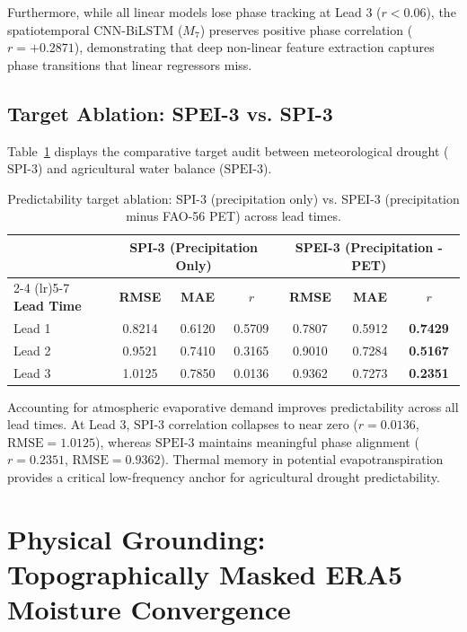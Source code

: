 \documentclass{article}
\begin{document}
Furthermore, while all linear models lose phase tracking at Lead 3 ($r < 0.06$), the spatiotemporal CNN-BiLSTM ($M_7$) preserves positive phase correlation ($r = +0.2871$), demonstrating that deep non-linear feature extraction captures phase transitions that linear regressors miss.

\subsection{Target Ablation: SPEI-3 vs. SPI-3}
Table~\ref{tab:target_ablation} displays the comparative target audit between meteorological drought ($\text{SPI-3}$) and agricultural water balance ($\text{SPEI-3}$).

\begin{table}[H]
\centering
\caption{Predictability target ablation: SPI-3 (precipitation only) vs. SPEI-3 (precipitation minus FAO-56 PET) across lead times.}
\label{tab:target_ablation}
\begin{tabular}{l ccc ccc}
\toprule
& \multicolumn{3}{c}{\textbf{SPI-3 (Precipitation Only)}} & \multicolumn{3}{c}{\textbf{SPEI-3 (Precipitation - PET)}} \\
\cmidrule(lr){2-4} \cmidrule(lr){5-7}
\textbf{Lead Time} & \textbf{RMSE} & \textbf{MAE} & \textbf{$r$} & \textbf{RMSE} & \textbf{MAE} & \textbf{$r$} \\
\midrule
Lead 1 & 0.8214 & 0.6120 & 0.5709 & 0.7807 & 0.5912 & \textbf{0.7429} \\
Lead 2 & 0.9521 & 0.7410 & 0.3165 & 0.9010 & 0.7284 & \textbf{0.5167} \\
Lead 3 & 1.0125 & 0.7850 & 0.0136 & 0.9362 & 0.7273 & \textbf{0.2351} \\
\bottomrule
\end{tabular}
\end{table}

Accounting for atmospheric evaporative demand improves predictability across all lead times. At Lead 3, $\text{SPI-3}$ correlation collapses to near zero ($r = 0.0136$, $\text{RMSE} = 1.0125$), whereas $\text{SPEI-3}$ maintains meaningful phase alignment ($r = 0.2351$, $\text{RMSE} = 0.9362$). Thermal memory in potential evapotranspiration provides a critical low-frequency anchor for agricultural drought predictability.

\section{Physical Grounding: Topographically Masked ERA5 Moisture Convergence}
\label{sec:physics}
\end{document}
